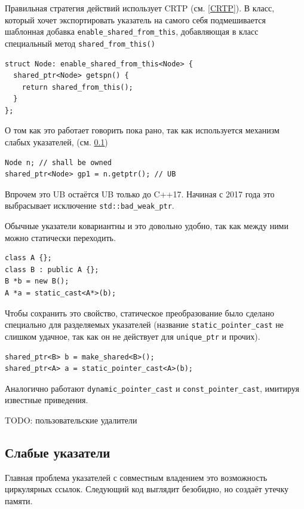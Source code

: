 \documentclass[a4paper,12pt,oneside]{book}
\begin{document}
Правильная стратегия действий использует CRTP (см. \ref{CRTP}). В класс, который хочет экспортировать указатель на самого себя подмешивается шаблонная добавка \lstinline!enable_shared_from_this!, добавляющая в класс специальный метод \lstinline!shared_from_this()!

\begin{lstlisting}
struct Node: enable_shared_from_this<Node> {
  shared_ptr<Node> getspn() {
    return shared_from_this();
  }
};
\end{lstlisting}

О том как это работает говорить пока рано, так как используется механизм слабых указателей, (см. \ref{subsub:weakptrs})

\begin{lstlisting}
Node n; // shall be owned
shared_ptr<Node> gp1 = n.getptr(); // UB
\end{lstlisting}

Впрочем это UB остаётся UB только до C++17. Начиная с 2017 года это выбрасывает исключение \lstinline!std::bad_weak_ptr!.

Обычные указатели ковариантны и это довольно удобно, так как между ними можно статически переходить.

\begin{lstlisting}
class A {};
class B : public A {};
B *b = new B();
A *a = static_cast<A*>(b);
\end{lstlisting}

Чтобы сохранить это свойство, статическое преобразование было сделано специально для разделяемых указателей (название \lstinline!static_pointer_cast! не слишком удачное, так как он не действует для \lstinline!unique_ptr! и прочих).

\begin{lstlisting}
shared_ptr<B> b = make_shared<B>();
shared_ptr<A> a = static_pointer_cast<A>(b);
\end{lstlisting}

Аналогично работают \lstinline!dynamic_pointer_cast! и \lstinline!const_pointer_cast!, имитируя известные приведения.

TODO: пользовательские удалители

\subsection{Слабые указатели}\label{subsub:weakptrs}

Главная проблема указателей с совместным владением это возможность циркулярных ссылок. Следующий код выглядит безобидно, но создаёт утечку памяти.
\end{document}
